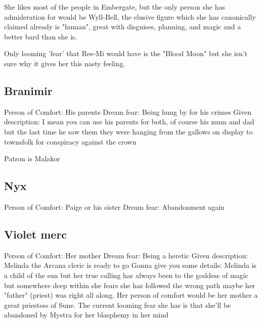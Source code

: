 \documentclass{article}
\begin{document}
        She likes most of the people in Embergate, but the only person she has admideration for would be Wyll-Bell, the elusive figure which she has canonically claimed already is "human", great with disguises, planning, and magic and a better bard than she is.

        Only looming 'fear' that Ree-Mi would have is the "Blood Moon" but she isn't sure why it gives her this nasty feeling.
    \subsection{Branimir}
    Person of Comfort:
        His parents
    Dream fear:
        Being hung by for his crimes
    Given description:
        I mean you can use his parents for both, of course his mum and dad but the last time he saw them they 
        were hanging from the gallows on display to townsfolk for conspiracy against the crown

        Patron is Malakor

    \subsection{Nyx}
    Person of Comfort: 
        Paige or his sister
    Dream fear: 
        Abandonment again
    \subsection{Violet merc}
    Person of Comfort:
        Her mother
    Dream fear:
        Being a heretic
    Given description:
        Melinda the Arcana cleric is ready to go Gonna give you some details:
        Melinda is a child of the sun but her true calling has  always been to the goddess of magic but somewhere deep within she fears she has followed the wrong path maybe her "father" (priest) was right all along. 
        Her person of comfort would be her mother a great priestess of Sune. 
        The current looming fear she has is that she'll be abandoned by Mystra for her blasphemy in her mind 
     

    
\end{document}
